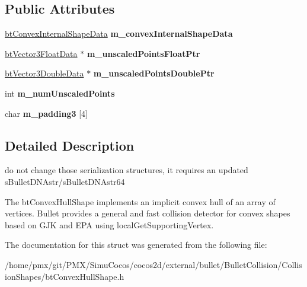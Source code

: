 \subsection*{Public Attributes}
\begin{DoxyCompactItemize}
\item 
\mbox{\label{structbtConvexHullShapeData_a643d3c12db61606e5238270a2547e06b}} 
\hyperlink{structbtConvexInternalShapeData}{bt\+Convex\+Internal\+Shape\+Data} {\bfseries m\+\_\+convex\+Internal\+Shape\+Data}
\item 
\mbox{\label{structbtConvexHullShapeData_af912413e18682e8680f5c4ce498e8b6e}} 
\hyperlink{structbtVector3FloatData}{bt\+Vector3\+Float\+Data} $\ast$ {\bfseries m\+\_\+unscaled\+Points\+Float\+Ptr}
\item 
\mbox{\label{structbtConvexHullShapeData_ad2dbe88b8db2f0aa0cc7388fc3d86c4a}} 
\hyperlink{structbtVector3DoubleData}{bt\+Vector3\+Double\+Data} $\ast$ {\bfseries m\+\_\+unscaled\+Points\+Double\+Ptr}
\item 
\mbox{\label{structbtConvexHullShapeData_af34acdf265280b28caf5f86cea62e01c}} 
int {\bfseries m\+\_\+num\+Unscaled\+Points}
\item 
\mbox{\label{structbtConvexHullShapeData_a97cf22f10ceb1595db31af8cf65d32ff}} 
char {\bfseries m\+\_\+padding3} \mbox{[}4\mbox{]}
\end{DoxyCompactItemize}


\subsection{Detailed Description}
do not change those serialization structures, it requires an updated s\+Bullet\+D\+N\+Astr/s\+Bullet\+D\+N\+Astr64 

The bt\+Convex\+Hull\+Shape implements an implicit convex hull of an array of vertices. Bullet provides a general and fast collision detector for convex shapes based on G\+JK and E\+PA using local\+Get\+Supporting\+Vertex. 

The documentation for this struct was generated from the following file\+:\begin{DoxyCompactItemize}
\item 
/home/pmx/git/\+P\+M\+X/\+Simu\+Cocos/cocos2d/external/bullet/\+Bullet\+Collision/\+Collision\+Shapes/bt\+Convex\+Hull\+Shape.\+h\end{DoxyCompactItemize}
